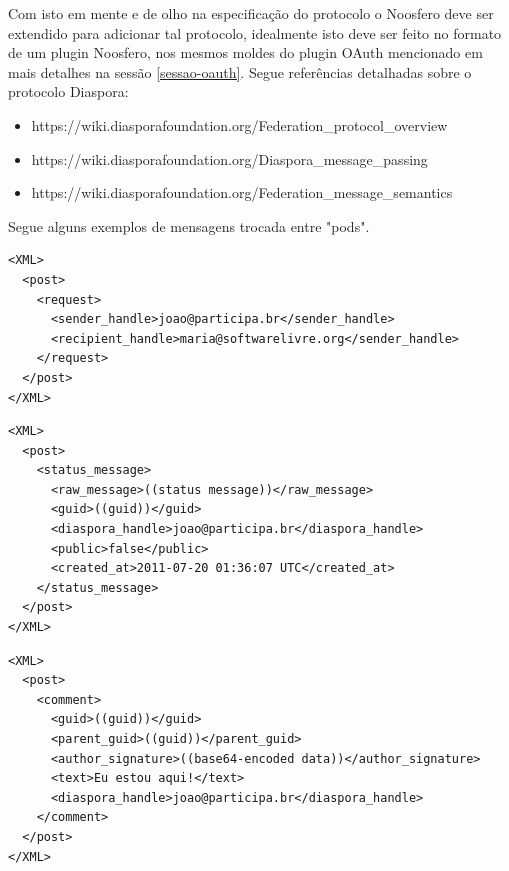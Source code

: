\documentclass[12pt]{article}
\begin{document}
Com isto em mente e de olho na especificação do protocolo o Noosfero deve ser
extendido para adicionar tal protocolo, idealmente isto deve ser feito no
formato de um plugin Noosfero, nos mesmos moldes do plugin OAuth mencionado em
mais detalhes na sessão \ref{sessao-oauth}. Segue referências detalhadas
sobre o protocolo Diaspora:

\begin{itemize}
  \item https://wiki.diasporafoundation.org/Federation\_protocol\_overview
  \item https://wiki.diasporafoundation.org/Diaspora\_message\_passing
  \item https://wiki.diasporafoundation.org/Federation\_message\_semantics
\end{itemize}

Segue alguns exemplos de mensagens trocada entre "pods".

\begin{framed}
\begin{lstlisting}[caption=Exemplo de notificação de compartilhamento]
<XML>
  <post>
    <request>
      <sender_handle>joao@participa.br</sender_handle>
      <recipient_handle>maria@softwarelivre.org</sender_handle>
    </request>
  </post>
</XML>
\end{lstlisting}
\end{framed}

\begin{framed}
\begin{lstlisting}[caption=Exemplo de atualização de status]
<XML>
  <post>
    <status_message>
      <raw_message>((status message))</raw_message>
      <guid>((guid))</guid>
      <diaspora_handle>joao@participa.br</diaspora_handle>
      <public>false</public>
      <created_at>2011-07-20 01:36:07 UTC</created_at>
    </status_message>
  </post>
</XML>
\end{lstlisting}
\end{framed}

\begin{framed}
\begin{lstlisting}[caption=Exemplo de comentário em uma atualização de status]
<XML>
  <post>
    <comment>
      <guid>((guid))</guid>
      <parent_guid>((guid))</parent_guid>
      <author_signature>((base64-encoded data))</author_signature>
      <text>Eu estou aqui!</text>
      <diaspora_handle>joao@participa.br</diaspora_handle>
    </comment>
  </post>
</XML>
\end{lstlisting}
\end{framed}
\end{document}
